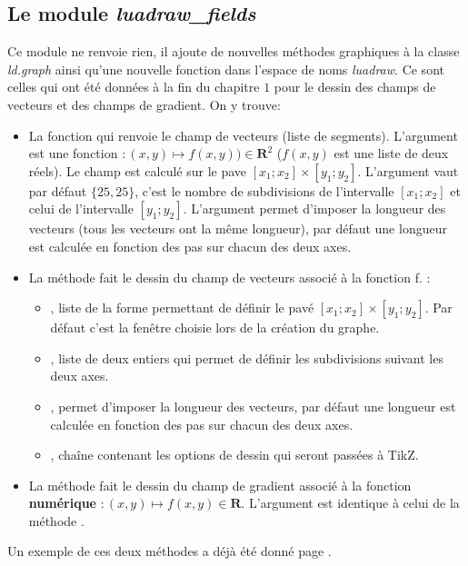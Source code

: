 \subsection{Le module \emph{luadraw\_fields}}


Ce module ne renvoie rien, il ajoute de nouvelles méthodes graphiques à la classe \emph{ld.graph} ainsi qu'une nouvelle fonction dans l'espace de noms \emph{luadraw}. Ce sont celles qui ont été données à la fin du chapitre $1$ pour le dessin des champs de vecteurs et des champs de gradient. On y trouve:

\begin{itemize}
    \item La fonction  qui renvoie le champ de vecteurs (liste de segments). L'argument  est une fonction $\colon(x,y)\mapsto f(x,y))\in\mathbf R^2$ ($f(x,y)$ est une liste de deux réels). Le champ est calculé sur le pave $[x_1;x_2]\times[y_1;y_2]$. L'argument  vaut par défaut $\{25,25\}$, c'est le nombre de subdivisions de l'intervalle $[x_1;x_2]$ et celui de l'intervalle $[y_1;y_2]$. L'argument  permet d'imposer la longueur des vecteurs (tous les vecteurs ont la même longueur), par défaut une longueur est calculée en fonction des pas sur chacun des deux axes.
    
    \item La méthode  fait le dessin du champ de vecteurs associé à la fonction \argu f. \writeoptions :
        \begin{itemize}
            \item {}, liste de la forme  permettant de définir le pavé $[x_1;x_2]\times [y_1;y_2]$. Par défaut c'est la fenêtre choisie lors de la création du graphe.
            \item {}, liste de deux entiers qui permet de définir les subdivisions suivant les deux axes.
            \item {}, permet d'imposer la longueur des vecteurs, par défaut une longueur est calculée en fonction des pas sur chacun des deux axes.
            \item {}, chaîne contenant les options de dessin qui seront passées à TikZ.
        \end{itemize}
        
    \item La méthode  fait le dessin du champ de gradient associé à la fonction \textbf{numérique} $\colon(x,y)\mapsto f(x,y)\in \mathbf R$. L'argument  est identique à celui de la méthode .
\end{itemize}

Un exemple de ces deux méthodes a déjà été donné page \pageref{fields}.
